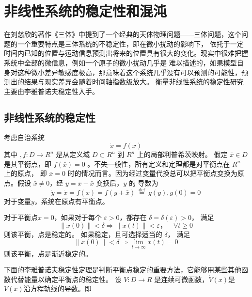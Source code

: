 \section{非线性系统的稳定性和混沌}
在刘慈欣的著作《三体》中提到了一个经典的天体物理问题——三体问题，这个问题的一个重要特点是三体系统的不稳定性，即在微小扰动的影响下，
依托于一定时间内已知的位置与运动信息预测出将来的位置具有很大的变化。现实中很难把握系统中全部的微信息，例如一个原子的微小扰动几乎是
难以描述的，如果模型自身对这种微小差异敏感度极高，那意味着这个系统几乎没有可以预测的可能性，预测出的结果与现实差异会随着时间轴指数级放大。
衡量非线性系统的稳定性研究主要由李雅普诺夫稳定性入手。
\subsection{非线性系统的稳定性}
考虑自治系统
\begin{equation}
    \dot{x}=f(x)
\end{equation}
其中 $,f: D \rightarrow R^n$ 是从定义域 $D \subset R^n$ 到 $R^n$ 上的局部利普希茨映射。
假定 $\bar{x} \in D$ 是其平衡点，即 $f(\bar{x})=0$ 。不失一般性，所有定义和定理都是对平衡点在 $R^n$ 上的原点，
即 $\bar{x}=0$ 时的情况而言。因为经过变量代换总可以把平衡点变换为原点。假设 $\bar{x} \neq 0$，经 $y=x-\bar{x}$ 变换后，$y$ 的
导数为
\begin{equation}
    \dot{y}=\dot{x}=f(x)=f(y+\bar{x}) \stackrel{\text { def }}{=} g(y),g(0)=0
\end{equation}
对于变量$y$，系统在原点有平衡点。
\begin{definition}
    对于平衡点$x=0$，如果对于每个 $\varepsilon>0$，都存在 $\delta=\delta(\varepsilon)>0$， 满足
    \begin{equation}
        \|x(0)\|<\delta \Rightarrow\|x(t)\|<\varepsilon，\quad \forall t \geqslant 0
    \end{equation}
    则该平衡，点是稳定的。
    如果稳定，且可选择适当的 $\delta$， 满足
    \begin{equation}
        \|x(0)\|<\delta \Rightarrow \lim _{t \rightarrow \infty} x(t)=0
    \end{equation}
    则该平衡，点是渐近稳定的。
\end{definition}
下面的李雅普诺夫稳定性定理是判断平衡点稳定的重要方法，它能够用某些其他函数代替能量以确定平衡点的稳定性。
设 $V: D \rightarrow R$ 是连续可微函数，$\dot{V}(x)$是$V(x)$沿方程轨线的导数。即
